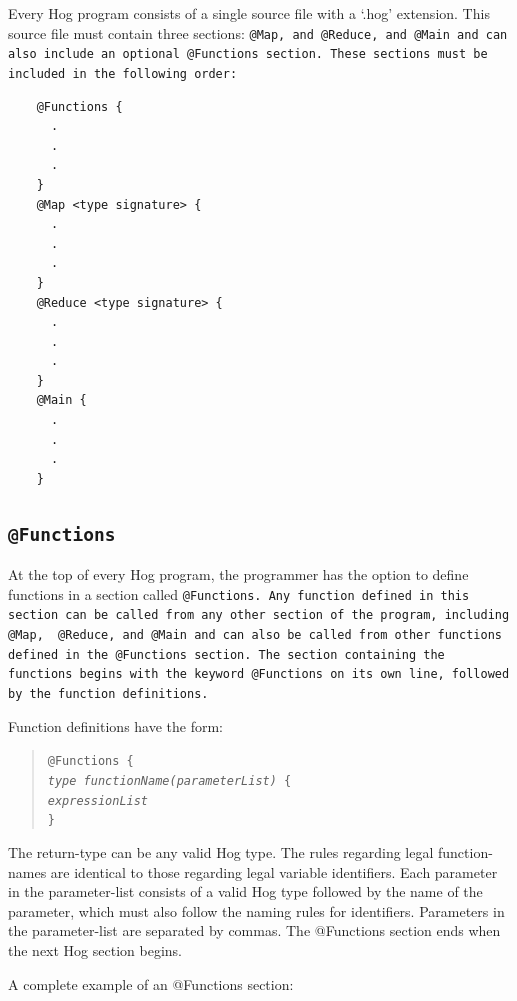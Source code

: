 \documentclass{article}
\begin{document}
Every Hog program consists of a single source file with a ‘.hog’ extension. This
source file must contain three sections: \tt @Map\rm, and \tt @Reduce\rm, and
\tt @Main \rm and can also include an optional \tt @Functions \rm section. These
sections must be included in the following order:

\begin{verbatim}
    @Functions {
      .
      .
      .
    }
    @Map <type signature> {
      .
      .
      .
    }
    @Reduce <type signature> {
      .
      .
      .
    }
    @Main {
      .
      .
      .
    }
\end{verbatim}


\subsection{\tt @Functions\rm} %
\label{sub:tt_functionsrm}

At the top of every Hog program, the programmer has the option to define functions
in a section called \tt @Functions\rm. Any function defined in this section can be
called from any other section of the program, including \tt @Map\rm, \tt
@Reduce\rm, and \tt @Main \rm and can also be called from other functions defined
in the \tt @Functions \rm section. The section containing the functions begins
with the keyword \tt @Functions \rm on its own line, followed by the function
definitions.

Function definitions have the form:

\begin{quotation}
  \tt @Functions \{ \rm \\
  \indent \emph{type functionName(parameterList)} \tt \{ \rm \\
  \indent \indent \emph{expressionList} \\
  \indent \tt \}
\end{quotation}

The return-type can be any valid Hog type. The rules regarding legal function-names
are identical to those regarding legal variable identifiers. Each parameter in the
parameter-list consists of a valid Hog type followed by the name of the parameter,
which must also follow the naming rules for identifiers. Parameters in the
parameter-list are separated by commas. The @Functions section ends when the next
Hog section begins.

A complete example of an @Functions section:
\end{document}
